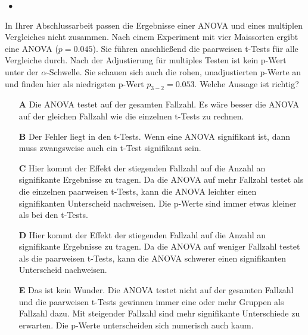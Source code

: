 \documentclass[a4paper, 9pt]{scrartcl}\usepackage[]{graphicx}\usepackage[]{xcolor}
\begin{document}
\ifcollection
\begin{flushright}
\tiny\vspace{-2Ex}
\textbf{\examinhaltstart}
\exammodulestatversuch $\;\bullet$
\exammodulebiostat
\vspace{-1Ex}
\end{flushright}
\fi




In Ihrer Abschlussarbeit passen die Ergebnisse einer ANOVA und eines multiplen Vergleiches nicht zusammen. Nach einem Experiment mit vier Maissorten ergibt eine ANOVA ($p = 0.045$). Sie führen anschließend die paarweisen t-Tests für alle Vergleiche durch. Nach der Adjustierung für multiples Testen ist kein p-Wert unter der $\alpha$-Schwelle. Sie schauen sich auch die rohen, unadjustierten p-Werte an und finden hier als niedrigsten p-Wert $p_{3-2} = 0.053$. Welche Aussage ist richtig?




\begin{enumerate}
\item [\textbf{A} \msquare] Die ANOVA testet auf der gesamten Fallzahl. Es wäre besser die ANOVA auf der gleichen Fallzahl wie die einzelnen t-Tests zu rechnen.
\item [\textbf{B} \msquare] Der Fehler liegt in den t-Tests. Wenn eine ANOVA signifikant ist, dann muss zwangsweise auch ein t-Test signifikant sein.
\item [\textbf{C} \msquare] Hier kommt der Effekt der stiegenden Fallzahl auf die Anzahl an signifikante Ergebnisse zu tragen. Da die ANOVA auf mehr Fallzahl testet als die einzelnen paarweisen t-Tests, kann die ANOVA leichter einen signifikanten Unterscheid nachweisen. Die p-Werte sind immer etwas kleiner als bei den t-Tests.
\item [\textbf{D} \msquare] Hier kommt der Effekt der stiegenden Fallzahl auf die Anzahl an signifikante Ergebnisse zu tragen. Da die ANOVA auf weniger Fallzahl testet als die paarweisen t-Tests, kann die ANOVA schwerer einen signifikanten Unterscheid nachweisen.
\item [\textbf{E} \msquare] Das ist kein Wunder. Die ANOVA testet nicht auf der gesamten Fallzahl und die paarweisen t-Tests gewinnen immer eine oder mehr Gruppen als Fallzahl dazu. Mit steigender Fallzahl sind mehr signifikante Unterschiede zu erwarten. Die p-Werte unterscheiden sich numerisch auch kaum.
\end{enumerate}
\end{document}
